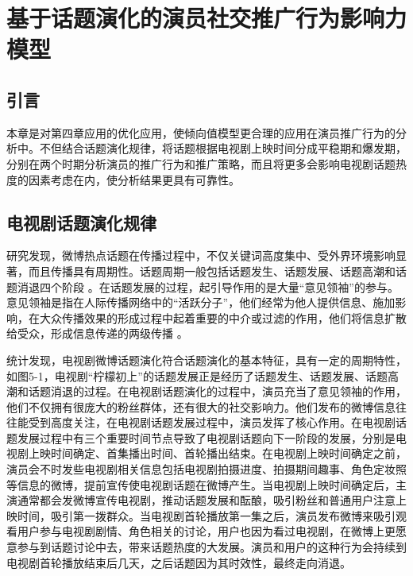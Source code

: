 \chapter{基于话题演化的演员社交推广行为影响力模型}
\label{model}

\section{引言}
本章是对第四章应用的优化应用，使倾向值模型更合理的应用在演员推广行为的分析中。不但结合话题演化规律，将话题根据电视剧上映时间分成平稳期和爆发期，分别在两个时期分析演员的推广行为和推广策略，而且将更多会影响电视剧话题热度的因素考虑在内，使分析结果更具有可靠性。

\section{电视剧话题演化规律}
研究发现，微博热点话题在传播过程中，不仅关键词高度集中、受外界环境影响显著，而且传播具有周期性。话题周期一般包括话题发生、话题发展、话题高潮和话题消退四个阶段 \cite{赵龙文2013基于意见领袖参与行为的微博话题热度预测研究}。在话题发展的过程，起引导作用的是大量“意见领袖”的参与。意见领袖是指在人际传播网络中的“活跃分子”，他们经常为他人提供信息、施加影响，在大众传播效果的形成过程中起着重要的中介或过滤的作用，他们将信息扩散给受众，形成信息传递的两级传播 \cite{http://baike.baidu.com/link?url=VE98zoCZ8paIYRmIAvmZIwv9F_u8nXU-5yLru_SxRWG5i4-sl2h59-eJu6Op6w10-ZsQAyrQpv7mizJS3FOs2YtnNeqklulN0vvuSKM4vS-vGbZunTtAPQirQPfb0Cg7}。

统计发现，电视剧微博话题演化符合话题演化的基本特征，具有一定的周期特性，如图5-1，电视剧“柠檬初上”的话题发展正是经历了话题发生、话题发展、话题高潮和话题消退的过程。在电视剧话题演化的过程中，演员充当了意见领袖的作用，他们不仅拥有很庞大的粉丝群体，还有很大的社交影响力。他们发布的微博信息往往能受到高度关注，在电视剧话题发展过程中，演员发挥了核心作用。在电视剧话题发展过程中有三个重要时间节点导致了电视剧话题向下一阶段的发展，分别是电视剧上映时间确定、首集播出时间、首轮播出结束。在电视剧上映时间确定之前，演员会不时发些电视剧相关信息包括电视剧拍摄进度、拍摄期间趣事、角色定妆照等信息的微博，提前宣传使电视剧话题在微博产生。当电视剧上映时间确定后，主演通常都会发微博宣传电视剧，推动话题发展和酝酿，吸引粉丝和普通用户注意上映时间，吸引第一拨群众。当电视剧首轮播放第一集之后，演员发布微博来吸引观看用户参与电视剧剧情、角色相关的讨论，用户也因为看过电视剧，在微博上更愿意参与到话题讨论中去，带来话题热度的大发展。演员和用户的这种行为会持续到电视剧首轮播放结束后几天，之后话题因为其时效性，最终走向消退。

